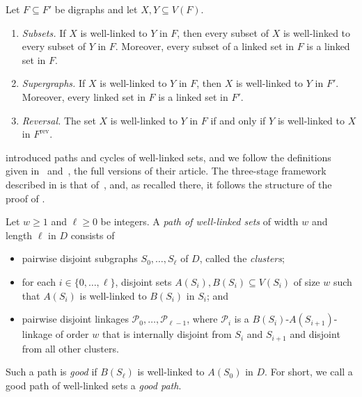\documentclass[fontsize=12pt,leading=14pt]{fullpaper}
\newcommand{\rev}{\mathrm{rev}}
\newcommand{\Pcal}{\mathcal{P}}
\begin{document}
\begin{observation}\label{obs:linked}
  Let $F\subseteq F'$ be digraphs and let $X,Y\subseteq V(F)$.
  \begin{enumerate}[label=\textnormal{(\roman*)}]
    \item\label{item:linked-sub} \emph{Subsets.} If $X$ is well-linked to $Y$ in $F$, then every subset of $X$ is well-linked to every subset of $Y$ in $F$.
      Moreover, every subset of a linked set in $F$ is a linked set in $F$.
    \item\label{item:linked-super} \emph{Supergraphs.} If $X$ is well-linked to $Y$ in $F$, then $X$ is well-linked to $Y$ in $F'$.
      Moreover, every linked set in $F$ is a linked set in $F'$.
    \item\label{item:linked-rev} \emph{Reversal.} The set $X$ is well-linked to $Y$ in $F$ if and only if $Y$ is well-linked to $X$ in $F^\rev$.
  \end{enumerate}
\end{observation}

\textcite{HKMM24} introduced paths and cycles of well-linked sets, and we follow the definitions given in~\cite[Definition~8.1]{HKMM26a} and~\cite[Definition~3.15]{HKMM26b}, the full versions of their article.
The three-stage framework described in  is that of~\cite{HKMM24,HKMM26a,HKMM26b}, and, as recalled there, it follows the structure of the proof of \textcite{KawarabayashiK15}.

\begin{definition}\label{def:wl-path}
  Let $w\ge1$ and $\ell\ge0$ be integers.
  A \emph{path of well-linked sets} of width $w$ and length $\ell$ in $D$ consists of
  \begin{itemize}
    \item pairwise disjoint subgraphs $S_0,\dots,S_\ell$ of $D$, called the \emph{clusters};
    \item for each $i\in\{0,\dots,\ell\}$, disjoint sets $A(S_i),B(S_i)\subseteq V(S_i)$ of size $w$ such that $A(S_i)$ is well-linked to $B(S_i)$ in $S_i$; and
    \item pairwise disjoint linkages $\Pcal_0,\dots,\Pcal_{\ell-1}$, where $\Pcal_i$ is a $B(S_i)$-$A(S_{i+1})$-linkage of order $w$ that is internally disjoint from $S_i$ and $S_{i+1}$ and disjoint from all other clusters.
  \end{itemize}
  Such a path is \emph{good} if $B(S_\ell)$ is well-linked to $A(S_0)$ in $D$.
  For short, we call a good path of well-linked sets a \emph{good path}.
\end{definition}
\end{document}
